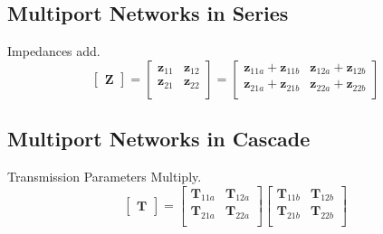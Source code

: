	\subsection*{Multiport Networks in Series} \label{subsec:Series Multiport Networks}
	Impedances add.
		\begin{equation*} \label{eq:Series Multiport Networks}
			\begin{bmatrix}
				\mathbf{Z}
			\end{bmatrix}
			= \begin{bmatrix}
				\mathbf{z}_{11} & \mathbf{z}_{12} \\
				\mathbf{z}_{21} & \mathbf{z}_{22} \\
			\end{bmatrix}
			= \begin{bmatrix}
				\mathbf{z}_{11a}+\mathbf{z}_{11b} & \mathbf{z}_{12a}+\mathbf{z}_{12b} \\
				\mathbf{z}_{21a}+\mathbf{z}_{21b} & \mathbf{z}_{22a}+\mathbf{z}_{22b} \\
			\end{bmatrix}
		\end{equation*}	
	
	\subsection*{Multiport Networks in Cascade} \label{subsec:Cascade Multiport Networks}
	Transmission Parameters Multiply.
		\begin{equation*} \label{eq:Cascade Multiport Networks}
			\begin{bmatrix}
				\mathbf{T}
				\end{bmatrix}
			= \begin{bmatrix}
				\mathbf{T}_{11a} & \mathbf{T}_{12a} \\
				\mathbf{T}_{21a} & \mathbf{T}_{22a} \\
			\end{bmatrix}
			\begin{bmatrix}
				\mathbf{T}_{11b} & \mathbf{T}_{12b} \\
				\mathbf{T}_{21b} & \mathbf{T}_{22b} \\
			\end{bmatrix}
		\end{equation*}
	
